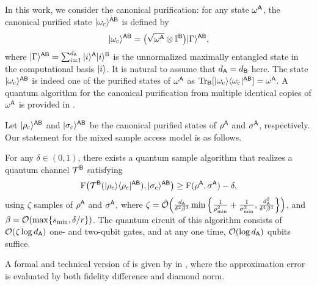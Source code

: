 In this work, we consider the canonical purification: for any state $\omega^{\mathsf{A}}$, the canonical purified state $|\omega_{\rm c}\rangle^{{\mathsf{A}}{\mathsf{B}}}$ is defined by 
\begin{equation}
\label{eq:def of canonical purification}
    |\omega_{\rm c}\rangle^{{\mathsf{A}}{\mathsf{B}}} = \big(\sqrt{\omega^{\mathsf{A}}} \otimes \mathbb{I}^{{\mathsf{B}}}\big)|\Gamma\rangle^{{\mathsf{A}}{\mathsf{B}}},
\end{equation}
where $|\Gamma\rangle^{{\mathsf{A}}{\mathsf{B}}} = \sum_{i=1}^{d_{\mathsf{A}}}|i\rangle^{{\mathsf{A}}}|i\rangle^{{\mathsf{B}}}$ is the unnormalized maximally entangled state in the computational basis $|i\rangle$. 
It is natural to assume that $d_{\mathsf{A}} = d_{\mathsf{B}}$ here.
The state $|\omega_{\rm c}\rangle^{{\mathsf{A}}{\mathsf{B}}}$ is indeed one of the purified states of $\omega^{\mathsf{A}}$ as $\operatorname{Tr}_{\mathsf{B}}[|\omega_{\rm c}\rangle\langle\omega_{\rm c}|^{{\mathsf{A}}{\mathsf{B}}}] = \omega^{\mathsf{A}}$.
A quantum algorithm for the canonical purification from multiple identical copies of $\omega^{\mathsf{A}}$ is provided in .


Let $|\rho_{\rm c}\rangle^{{\mathsf{A}}{\mathsf{B}}}$ and $|\sigma_{\rm c}\rangle^{{\mathsf{A}}{\mathsf{B}}}$ be the canonical purified states of $\rho^{\mathsf{A}}$ and $\sigma^{\mathsf{A}}$, respectively.
Our statement for the mixed sample access model is as follows.


\begin{theorem}
\label{infthm:uhlmenn mixed sample}
For any $\delta \in (0, 1)$, there exists a quantum sample algorithm that realizes a quantum channel ${\mathcal{T}}^{\mathsf{B}}$ satisfying 
\begin{align} 
    {\mathrm{F}}\big({\mathcal{T}}^{\mathsf{B}}(|\rho_{\rm c}\rangle\langle\rho_{\rm c}|^{{\mathsf{A}}{\mathsf{B}}}), |\sigma_{\rm c}\rangle^{{\mathsf{A}}{\mathsf{B}}}\big)  
    \geq {\mathrm{F}}(\rho^{\mathsf{A}}, \sigma^{\mathsf{A}}) - \delta, 
\end{align}
using $\zeta$ samples of $\rho^{\mathsf{A}}$ and $\sigma^{\mathsf{A}}$, where $\zeta = \tilde{{\mathcal{O}}}\Big(\frac{d_{\mathsf{A}}}{\delta^2\beta^3}\min\Big\{\frac{1}{\rho_{\rm min}^2} + \frac{1}{\sigma_{\rm min}^2}, \frac{d_{\mathsf{A}}^2}{\delta^4\beta^4}\Big\}\Big)$, and $\beta = {\mathcal{O}}(\max\{s_{\rm min}, \delta/r\})$. The quantum circuit of this algorithm consists of ${\mathcal{O}}(\zeta\log{d_{\mathsf{A}}})$ one- and two-qubit gates, and at any one time, ${\mathcal{O}}(\log{d_{\mathsf{A}}})$ qubits suffice.
\end{theorem}




A formal and technical version of  is given by  in , where the approximation error is evaluated by both fidelity difference and diamond norm.













